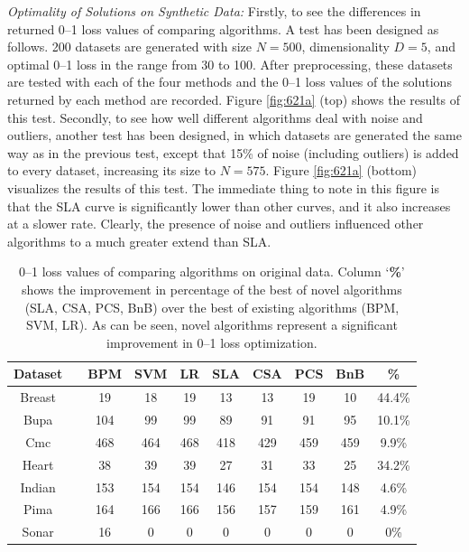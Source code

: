 \noindent\emph{Optimality of Solutions on Synthetic Data: }
Firstly, to see the differences in returned 0--1 loss values of
comparing algorithms. A test has been designed as follows. 200
datasets are generated with size $N=500$, dimensionality $D=5$, and
optimal 0--1 loss in the range from 30 to 100. After preprocessing,
these datasets are tested with each of the four methods and the 0--1
loss values of the solutions returned by each method are
recorded. Figure \ref{fig:621a} (top) shows the results of this test.
Secondly, to see how well different algorithms deal with noise and
outliers, another test has been designed, in which datasets are
generated the same way as in the previous test, except that 15\% of
noise (including outliers) is added to every dataset, increasing its
size to $N=575$. Figure \ref{fig:621a} (bottom) visualizes the results of this
test. The immediate thing to note in this figure is that the SLA curve
is significantly lower than other curves, and it also increases at a
slower rate. Clearly, the presence of noise and outliers influenced
other algorithms to a much greater extend than SLA. 


\begin{table}[htbp!]
\centering
{\footnotesize 
\begin{tabular}{|cc|  ccc|cccc|c|}
\hline\hline
{\bf Dataset} && {\bf BPM} & {\bf SVM} & {\bf LR} & {\bf SLA} & {\bf CSA} & {\bf PCS} & {\bf BnB} & {\bf \% }\\ 
\hline 
Breast	&& 19 & 18 & 19 & 13 		& 13 & 19 & 10 & 44.4\%\\  
Bupa		&& 104 & 99 & 99 & 89 		& 91 & 91 & 95 & 10.1\%\\   
Cmc		&& 468 & 464 & 468 & 418 	& 429 & 459 & 459 & 9.9\%\\   
Heart  	&& 38 & 39 & 39 & 27 		& 31 & 33 & 25 & 34.2\%\\  
Indian  	&& 153 & 154 & 154 & 146 	& 154 & 154 & 148 & 4.6\%\\    
Pima 	&& 164 & 166 & 166 & 156 	& 157 & 159 & 161 & 4.9\%\\    
Sonar  	&& 16 & 0 & 0 & 0 			& 0 & 0 & 0 & 0\%\\ 
\hline\hline
\end{tabular}}
\caption{0--1 loss values of comparing algorithms on original
  data. Column `{\bf \%}' shows the improvement in percentage of the
  best of novel algorithms (SLA, CSA, PCS, BnB) over the best of
  existing algorithms (BPM, SVM, LR). As can be seen, novel algorithms
  represent a significant improvement in 0--1 loss optimization.}
\label{tab:losses0noise}
\end{table}


